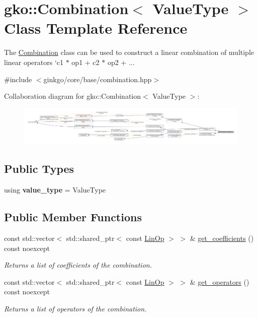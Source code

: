 \hypertarget{classgko_1_1Combination}{}\section{gko\+:\+:Combination$<$ Value\+Type $>$ Class Template Reference}
\label{classgko_1_1Combination}


The \hyperlink{classgko_1_1Combination}{Combination} class can be used to construct a linear combination of multiple linear operators `c1 $\ast$ op1 + c2 $\ast$ op2 + ...  




{\ttfamily \#include $<$ginkgo/core/base/combination.\+hpp$>$}



Collaboration diagram for gko\+:\+:Combination$<$ Value\+Type $>$\+:
\nopagebreak
\begin{figure}[H]
\begin{center}
\leavevmode
\includegraphics[width=350pt]{classgko_1_1Combination__coll__graph}
\end{center}
\end{figure}
\subsection*{Public Types}
\begin{DoxyCompactItemize}
\item 
\mbox{\label{classgko_1_1Combination_a503b5d7f5f35f6ff697e44a850f10f9f}} 
using {\bfseries value\+\_\+type} = Value\+Type
\end{DoxyCompactItemize}
\subsection*{Public Member Functions}
\begin{DoxyCompactItemize}
\item 
const std\+::vector$<$ std\+::shared\+\_\+ptr$<$ const \hyperlink{classgko_1_1LinOp}{Lin\+Op} $>$ $>$ \& \hyperlink{classgko_1_1Combination_ad5844423c39d70ee90d5dc432c83261f}{get\+\_\+coefficients} () const noexcept
\begin{DoxyCompactList}\small\item\em Returns a list of coefficients of the combination. \end{DoxyCompactList}\item 
const std\+::vector$<$ std\+::shared\+\_\+ptr$<$ const \hyperlink{classgko_1_1LinOp}{Lin\+Op} $>$ $>$ \& \hyperlink{classgko_1_1Combination_a75a81c2b91441ddea98949ef54f62441}{get\+\_\+operators} () const noexcept
\begin{DoxyCompactList}\small\item\em Returns a list of operators of the combination. \end{DoxyCompactList}\end{DoxyCompactItemize}
